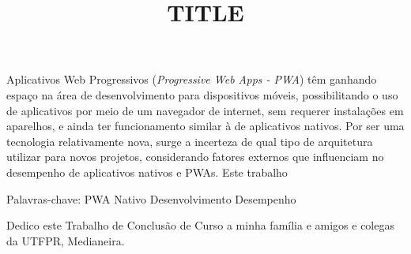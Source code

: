 \documentclass[oneside]{normas-utf-tex} %
\title{\MakeUppercase{TITLE}} %
\begin{document}
\capa %
\folhaderosto %

\termodeaprovacao

\begin{resumo}

Aplicativos Web Progressivos (\textit{Progressive Web Apps - PWA}) têm ganhando espaço na área de desenvolvimento para dispositivos móveis, possibilitando o uso de aplicativos por meio de um navegador de internet, sem requerer instalações em aparelhos, e ainda ter funcionamento similar à de aplicativos nativos. Por ser uma tecnologia relativamente nova, surge a incerteza de qual tipo de arquitetura utilizar para novos projetos, considerando fatores externos que influenciam no desempenho de aplicativos nativos e PWAs. Este trabalho %

Palavras-chave: PWA Nativo Desenvolvimento Desempenho

\end{resumo}

\begin{abstract}


\end{abstract}


\begin{dedicatoria}
Dedico este Trabalho de Conclusão de Curso a minha família e amigos e colegas da UTFPR, Medianeira.
\end{dedicatoria}
\end{document}
